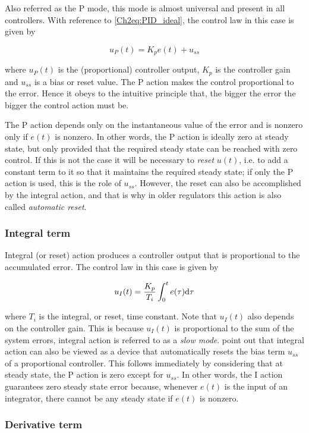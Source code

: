 Also referred as the P mode, this mode is almost universal and present in all controllers. With reference to \eqref{Ch2eq:PID_ideal}, the control law in this case is given by

\[u_P (t) = K_pe(t) + u_{ss}\]

\noindent where $u_P(t)$ is the (proportional) controller output, $K_p$ is the controller gain and $u_{ss}$ is a bias or reset value. The P action makes the control proportional to the error. Hence it obeys to the intuitive principle that, the bigger the error the bigger the control action must be.

The P action depends only on the instantaneous value of the error and is nonzero only if $e(t)$ is nonzero. In other words, the P action is ideally zero at steady state, but only provided that the required steady state can be reached with zero control. If this is not the case it will be necessary to \emph{reset} $u(t)$, i.e. to add a constant term to it so that it maintains the required steady state; if only the P action is used, this is the role of $u_{ss}$. However, the reset can also be accomplished by the integral action, and that is why  in older regulators this action is also called \emph{automatic reset}. 


\subsubsection*{Integral term}

Integral (or reset) action produces a controller output that is proportional to the accumulated error. The control law in this case is given by

\[u_I( t ) = \frac{K_p}{T_i}\int_0^t e(\tau)\mathrm{d} \tau \]

\noindent where $T_i$ is the integral, or reset, time constant. Note that $u_I(t)$ also depends on the controller gain. This is because  $u_I(t)$ is proportional to the sum of the system errors, integral action is referred to as a \emph{slow mode}. \citet{astromhagglund2006} point out that integral action can also be viewed as a device that automatically resets the bias term $u_{ss}$ of a proportional controller. This follows immediately by considering that at steady state,  the P action is zero except for $u_{ss}$. In other words, the I action guarantees zero steady state error because, whenever $e(t)$ is the input of an integrator, there cannot be any steady state if $e(t)$ is nonzero.

\subsubsection*{Derivative term}

